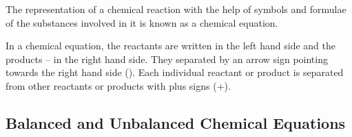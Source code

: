 \begin{outline}

    \1 The representation of a chemical reaction with the help of symbols and formulae of the substances involved in it is known as a chemical equation.

    \1 In a chemical equation, the reactants are written in the left hand side and the products -- in the right hand side. They separated by an arrow sign pointing towards the right hand side (\ch{->}). Each individual reactant or product is separated from other reactants or products with plus signs (+).
\end{outline}

\subsection{Balanced and Unbalanced Chemical Equations}

